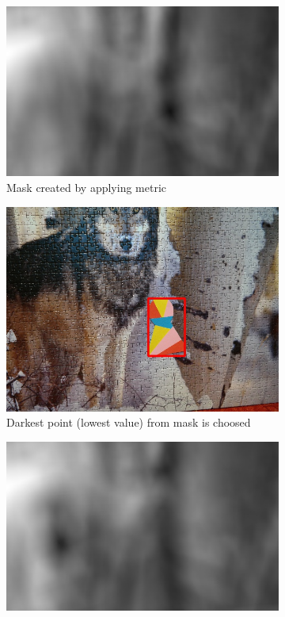 \begin{figure}
\begin{subfigure}{0.48\linewidth}
    \includegraphics[width=\linewidth]{img/pattern_matching/mask.jpg}
    \caption{Mask created by applying metric}
  \end{subfigure}
  \begin{subfigure}{0.48\linewidth}
    \includegraphics[width=\linewidth]{img/pattern_matching/result-correct.jpg}
    \caption{Darkest point (lowest value) from mask is choosed}
  \end{subfigure}
  \begin{subfigure}{0.48\linewidth}
    \includegraphics[width=\linewidth]{img/pattern_matching/mask-incorrect.jpg}

\end{subfigure}
\end{figure}
